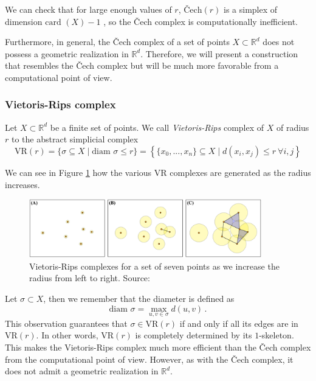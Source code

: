 \documentclass[../main.tex]{subfiles}
\begin{document}
We can check that for large enough values of $r$, $\text{\v{C}ech}(r)$ is a simplex of dimension $\text{card }(X)-1$ {\cite[Chapter~3]{bookEH}}, so the \v{C}ech complex is computationally inefficient.

Furthermore, in general, the \v{C}ech complex of a set of points $X \subset \mathbb{R}^d$ does not possess a geometric realization in $\mathbb{R}^d$. Therefore, we will present a construction that resembles the \v{C}ech complex but will be much more favorable from a computational point of view.

\subsubsection*{Vietoris-Rips complex}

\begin{definition}
Let $X \subset \mathbb{R}^d$ be a finite set of points. We call \emph{Vietoris-Rips} complex of $X$ of radius $r$ to the abstract simplicial complex 
\[
\text{VR}(r) = \{\sigma \subseteq  X \mid \textrm{diam } \sigma \leq r\} = \left\{ \{x_0, ..., x_n\} \subseteq  X \mid d(x_i, x_j) \leq r\ \forall i,j\right\}
\]
\end{definition}

We can see in Figure \ref{ref:vr} how the various VR complexes are generated as the radius increases.

\begin{figure}[!ht]
\centering
\includegraphics[width=0.9\textwidth]{figures/bg/vr.png} 
\caption{Vietoris-Rips complexes for a set of seven points as we increase the radius from left to right. Source: \cite{ulmer_topological_2019}}
\label{ref:vr}
\end{figure}


Let $\sigma \subset X$, then we remember that the diameter is defined as
\[\textrm{diam } \sigma = \max_{u,v \in \sigma} d(u,v)\,.\]
This observation guarantees that $\sigma \in \text{VR}(r)$ if and only if all its edges are in $\text{VR}(r)$. In other words, $\text{VR}(r)$ is completely determined by its $1$-skeleton. This makes the Vietoris-Rips complex much more efficient than the \v{C}ech complex from the computational point of view. However, as with the \v{C}ech complex, it does not admit a geometric realization in $\mathbb{R}^d$.
\end{document}
